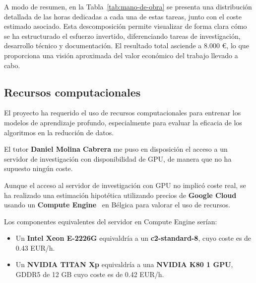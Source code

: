 A modo de resumen, en la Tabla~\ref{tab:mano-de-obra} se presenta una distribución detallada de las horas dedicadas a cada una de estas tareas,
junto con el coste estimado asociado.
Esta descomposición permite visualizar de forma clara cómo se ha estructurado el esfuerzo invertido, diferenciando tareas de investigación, desarrollo técnico y documentación.
El resultado total asciende a 8.000 €, lo que proporciona una visión aproximada del valor económico del trabajo llevado a cabo.

\subsection{Recursos computacionales}\label{subsec:recursos-computacionales}
El proyecto ha requerido el uso de recursos computacionales para entrenar los modelos de aprendizaje profundo,
especialmente para evaluar la eficacia de los algoritmos en la reducción de datos.


El tutor \textbf{Daniel Molina Cabrera} me puso en disposición el acceso a un servidor de investigación con
disponibilidad de GPU, de manera que no ha supuesto ningún coste.


Aunque el acceso al servidor de investigación con GPU no implicó coste real,
se ha realizado una estimación hipotética utilizando precios de \textbf{Google Cloud}~\cite{OverviewGoogleCloud}
usando un \textbf{Compute Engine}~\cite{WhatCloudRun} en Bélgica para valorar el uso de recursos.


Los componentes equivalentes del servidor en Compute Engine serían:
\begin{itemize}
    \item Un \textbf{Intel Xeon E-2226G} equivaldría a un \textbf{c2-standard-8}, cuyo coste es de 0.43 EUR/h.
    \item Un \textbf{NVIDIA TITAN Xp} equivaldría a una \textbf{NVIDIA K80 1 GPU}, GDDR5 de 12 GB cuyo coste es de 0.42
          EUR/h.
\end{itemize}

